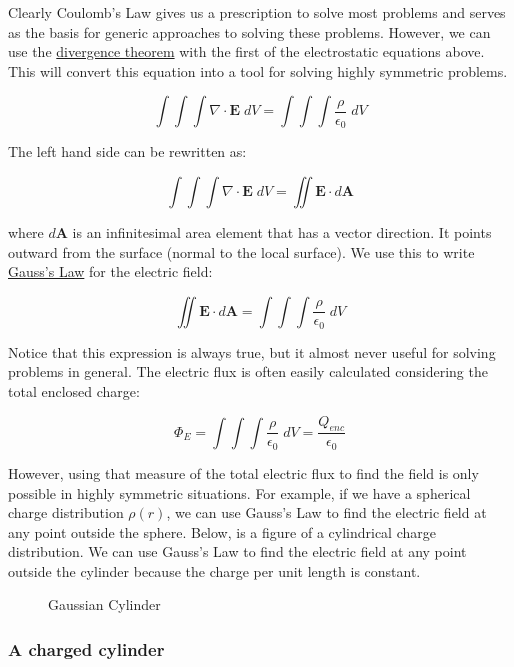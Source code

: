 Clearly Coulomb's Law gives us a prescription to solve most problems and
serves as the basis for generic approaches to solving these problems.
However, we can use the
\href{https://en.wikipedia.org/wiki/Divergence_theorem}{divergence
theorem} with the first of the electrostatic equations above. This will
convert this equation into a tool for solving highly symmetric problems.

\[\int \int \int \nabla \cdot \mathbf{E}\;dV = \int \int \int \dfrac{\rho}{\epsilon_0} \;dV\]

The left hand side can be rewritten as:

\[\int \int \int \nabla \cdot \mathbf{E}\;dV = \iint \mathbf{E} \cdot d\mathbf{A}\]

where \(d\mathbf{A}\) is an infinitesimal area element that has a vector
direction. It points outward from the surface (normal to the local
surface). We use this to write
\href{https://en.wikipedia.org/wiki/Gauss\%27s_law}{Gauss's Law} for the
electric field:

\[\iint \mathbf{E} \cdot d\mathbf{A} = \int \int \int \dfrac{\rho}{\epsilon_0}\;dV\]

Notice that this expression is always true, but it almost never useful
for solving problems in general. The electric flux is often easily
calculated considering the total enclosed charge:

\[\Phi_E = \int \int \int \dfrac{\rho}{\epsilon_0}\;dV = \dfrac{Q_{enc}}{\epsilon_0}\]

However, using that measure of the total electric flux to find the field
is only possible in highly symmetric situations. For example, if we have
a spherical charge distribution \(\rho(r)\), we can use Gauss's Law to
find the electric field at any point outside the sphere. Below, is a
figure of a cylindrical charge distribution. We can use Gauss's Law to
find the electric field at any point outside the cylinder because the
charge per unit length is constant.

\begin{figure}
\centering
{}
\caption{Gaussian Cylinder}
\end{figure}

\subsubsection{A charged cylinder}\label{a-charged-cylinder}

